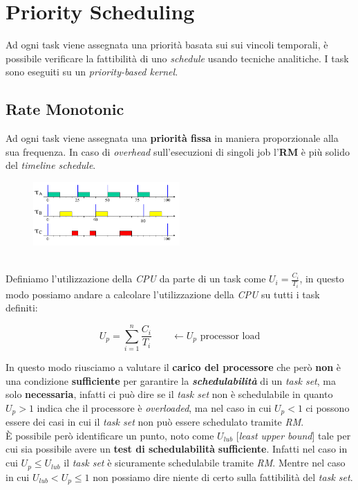 \section{Priority Scheduling}
Ad ogni task viene assegnata una priorità basata sui sui vincoli temporali, è possibile verificare la fattibilità di uno \textit{schedule} usando tecniche analitiche. I task sono eseguiti su un \textit{priority-based kernel}.

\subsection{Rate Monotonic}
Ad ogni task viene assegnata una \textbf{priorità fissa} in maniera proporzionale alla sua frequenza. In caso di \textit{overhead} sull'esecuzioni di singoli job l'\textbf{RM} è più solido del \textit{timeline schedule}.
\begin{figure}[h]
    \centering
    \includegraphics[width=0.5\textwidth]{img/rm_1}
\end{figure}
\\
Definiamo l'utilizzazione della \textit{CPU} da parte di un task come $U_i = \frac{C_i}{T_i}$, in questo modo possiamo andare a calcolare l'utilizzazione della \textit{CPU} su tutti i task definiti:
\begin{center}
    \[U_p = \sum_{i = 1}^{n} \frac{C_i}{T_i} \qquad \leftarrow U_p \text{ processor load} \]
\end{center}
In questo modo riusciamo a valutare il \textbf{carico del processore} che però \textbf{non} è una condizione \textbf{sufficiente} per garantire la \textbf{\textit{schedulabilità}} di un \textit{task set}, ma solo \textbf{necessaria}, infatti ci può dire se il \textit{task set} non è schedulabile in quanto $U_p > 1$ indica che il processore è \textit{overloaded}, ma nel caso in cui $U_p < 1$ ci possono essere dei casi in cui il \textit{task set} non può essere schedulato tramite \textit{RM}. \\
È possibile però identificare un punto, noto come $U_{lub}$ [\textit{least upper bound}] tale per cui sia possibile avere un \textbf{test di schedulabilità} \textbf{sufficiente}. Infatti nel caso in cui $U_p \leq U_{lub}$ il \textit{task set} è sicuramente schedulabile tramite \textit{RM}. Mentre nel caso in cui $U_{lub} < U_p \leq 1$ non possiamo dire niente di certo sulla fattibilità del \textit{task set}.

